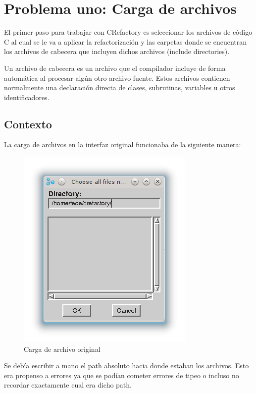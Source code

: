 \documentclass[a4paper,oneside,12pt]{article}
\begin{document}
\section{Problema uno: Carga de archivos}
\label{sec:problema_uno}

El primer paso para trabajar con CRefactory es seleccionar los archivos de c\'odigo C al cual se le va a aplicar la refactorizaci\'on y las carpetas donde se encuentran los archivos de cabecera que incluyen dichos archivos (include directories).

Un archivo de cabecera es un archivo que el compilador incluye de forma autom\'atica al procesar alg\'un otro archivo fuente. Estos archivos contienen normalmente una declaraci\'on directa de clases, subrutinas, variables u otros identificadores.


\subsection{Contexto}
La carga de archivos en la interfaz original funcionaba de la siguiente manera:

\begin{figure}[h!]
  \centering
    \includegraphics[scale=0.85]{images/codigo_original/carga.png}
    \caption{Carga de archivo original}
    \label{carga_original}
\end{figure}

Se deb\'ia escribir a mano el path absoluto hacia donde estaban los archivos. Esto era propenso a errores ya que se pod\'ian cometer errores de tipeo o incluso no recordar exactamente cual era dicho path.
\end{document}
